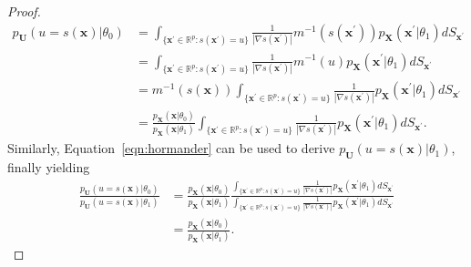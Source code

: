 \documentclass[12pt]{article}
\numberwithin{equation}{section}
\theoremstyle{plain}
\begin{document}
\begin{proof}
\begin{align}
p_{\mathbf{U}}(u=s(\mathbf{x})|\theta_0) &= \int_{\{\mathbf{x}^\prime \in \mathbb{R}^p : s(\mathbf{x}^\prime) = u\}}  \frac{1}{|\nabla s(\mathbf{x}^\prime)|} m^{-1}(s(\mathbf{x}^\prime)) p_\mathbf{X}(\mathbf{x}^\prime|\theta_1) dS_{\mathbf{x}^\prime} \nonumber \\
&= \int_{\{\mathbf{x}^\prime \in \mathbb{R}^p : s(\mathbf{x}^\prime) = u\}}  \frac{1}{|\nabla s(\mathbf{x}^\prime)|} m^{-1}(u) p_\mathbf{X}(\mathbf{x}^\prime|\theta_1) dS_{\mathbf{x}^\prime} \nonumber \\
&= m^{-1}(s(\mathbf{x})) \int_{\{\mathbf{x}^\prime \in \mathbb{R}^p : s(\mathbf{x}^\prime) = u\}}  \frac{1}{|\nabla s(\mathbf{x}^\prime)|}  p_\mathbf{X}(\mathbf{x}^\prime|\theta_1) dS_{\mathbf{x}^\prime} \nonumber \\
&= \frac{p_\mathbf{X}(\mathbf{x}|\theta_0)}{p_\mathbf{X}(\mathbf{x}|\theta_1)} \int_{\{\mathbf{x}^\prime \in \mathbb{R}^p : s(\mathbf{x}^\prime) = u\}}  \frac{1}{|\nabla s(\mathbf{x}^\prime)|}  p_\mathbf{X}(\mathbf{x}^\prime|\theta_1) dS_{\mathbf{x}^\prime}. \label{eqn:factorization}
\end{align}
Similarly, Equation~\ref{eqn:hormander} can be used to derive $p_{\mathbf{U}}(u=s(\mathbf{x})|\theta_1)$, finally yielding
\begin{align}
\frac{p_{\mathbf{U}}(u=s(\mathbf{x})|\theta_0)}{p_{\mathbf{U}}(u=s(\mathbf{x})|\theta_1)} &= \frac{p_\mathbf{X}(\mathbf{x}|\theta_0)}{p_\mathbf{X}(\mathbf{x}|\theta_1)} \frac{\int_{\{\mathbf{x}^\prime \in \mathbb{R}^p : s(\mathbf{x}^\prime) = u\}}  \frac{1}{|\nabla s(\mathbf{x}^\prime)|}  p_\mathbf{X}(\mathbf{x}^\prime|\theta_1) dS_{\mathbf{x}^\prime}}{ \int_{\{\mathbf{x}^\prime \in \mathbb{R}^p : s(\mathbf{x}^\prime) = u\}}  \frac{1}{|\nabla s(\mathbf{x}^\prime)|}  p_\mathbf{X}(\mathbf{x}^\prime|\theta_1) dS_{\mathbf{x}^\prime} } \nonumber \\
&= \frac{p_\mathbf{X}(\mathbf{x}|\theta_0)}{p_\mathbf{X}(\mathbf{x}|\theta_1)}. \label{eqn:jacob}
\end{align}
\end{proof}

\end{document}

